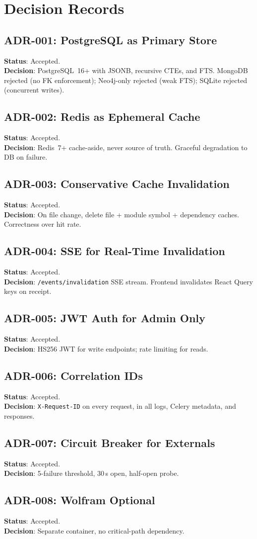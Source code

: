 \chapter{Decision Records}

\section{ADR-001: PostgreSQL as Primary Store}
\textbf{Status}: Accepted. \\
\textbf{Decision}: PostgreSQL~16+ with JSONB, recursive CTEs, and FTS.
MongoDB rejected (no FK enforcement); Neo4j-only rejected (weak FTS);
SQLite rejected (concurrent writes).

\section{ADR-002: Redis as Ephemeral Cache}
\textbf{Status}: Accepted. \\
\textbf{Decision}: Redis~7+ cache-aside, never source of truth.
Graceful degradation to DB on failure.

\section{ADR-003: Conservative Cache Invalidation}
\textbf{Status}: Accepted. \\
\textbf{Decision}: On file change, delete file + module symbol +
dependency caches.  Correctness over hit rate.

\section{ADR-004: SSE for Real-Time Invalidation}
\textbf{Status}: Accepted. \\
\textbf{Decision}: \texttt{/events/invalidation} SSE stream.
Frontend invalidates React Query keys on receipt.

\section{ADR-005: JWT Auth for Admin Only}
\textbf{Status}: Accepted. \\
\textbf{Decision}: HS256 JWT for write endpoints; rate limiting for reads.

\section{ADR-006: Correlation IDs}
\textbf{Status}: Accepted. \\
\textbf{Decision}: \texttt{X-Request-ID} on every request, in all logs,
Celery metadata, and responses.

\section{ADR-007: Circuit Breaker for Externals}
\textbf{Status}: Accepted. \\
\textbf{Decision}: 5-failure threshold, 30\,s open, half-open probe.

\section{ADR-008: Wolfram Optional}
\textbf{Status}: Accepted. \\
\textbf{Decision}: Separate container, no critical-path dependency.

